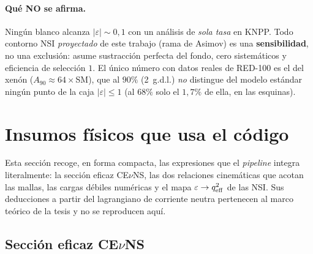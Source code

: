 \documentclass[11pt,a4paper]{article}
\newcommand{\eps}{\varepsilon}
\newcommand{\qeff}{q_{\rm eff}}
\begin{document}
\paragraph{Qu\'e NO se afirma.} Ning\'un blanco alcanza $|\eps|\sim 0{,}1$ con un
an\'alisis de \emph{sola tasa} en KNPP. Todo contorno NSI \emph{proyectado} de
este trabajo (rama de Asimov) es una \textbf{sensibilidad}, no una exclusi\'on:
asume sustracci\'on perfecta del fondo, cero sistem\'aticos y eficiencia de
selecci\'on $1$. El \'unico n\'umero con datos reales de RED-100 es el del
xen\'on ($A_{90}\approx 64\times$SM), que al $90\%$ (2~g.d.l.) \emph{no}
distingue del modelo est\'andar ning\'un punto de la caja $|\eps|\le 1$ (al
$68\%$ solo el $1{,}7\%$ de ella, en las esquinas).

\section{Insumos f\'isicos que usa el c\'odigo}
\label{sec:marco}

Esta secci\'on recoge, en forma compacta, las expresiones que el \emph{pipeline}
integra literalmente: la secci\'on eficaz CE$\nu$NS, las dos relaciones
cinem\'aticas que acotan las mallas, las cargas d\'ebiles num\'ericas y el mapa
$\eps\to\qeff^{2}$ de las NSI. Sus deducciones a partir del lagrangiano de
corriente neutra pertenecen al marco te\'orico de la tesis y no se reproducen
aqu\'i.

\subsection{Secci\'on eficaz CE$\nu$NS}
\label{sec:xsec}
\end{document}
